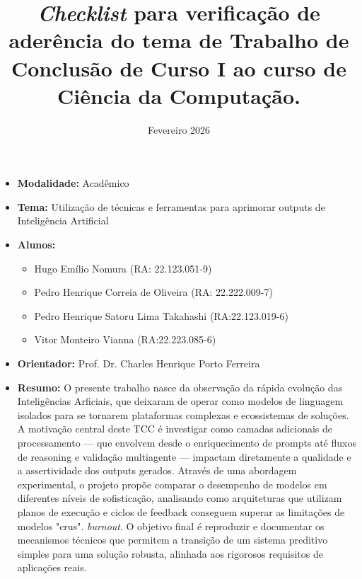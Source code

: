 \documentclass[11pt,a4,oneside]{article}
\title{\textit{Checklist} para verificação de aderência do tema de Trabalho de Conclusão de Curso I ao curso de Ciência da Computação.}
\date{Fevereiro 2026}
\begin{document}
\pagestyle{fancy}
\pagestyle{fancy}
\fancyhead{}

\maketitle
\begin{itemize}
\item \textbf{Modalidade:} Acadêmico
\item \textbf{Tema:} Utilização de técnicas e ferramentas para aprimorar outputs de Inteligência Artificial
\item \textbf{Alunos:}
\begin{itemize}
    \item Hugo Emílio Nomura (RA: 22.123.051-9)
    \item Pedro Henrique Correia de Oliveira (RA: 22.222.009-7)
    \item Pedro Henrique Satoru Lima Takahashi (RA:22.123.019-6)
    \item Vitor Monteiro Vianna (RA:22.223.085-6)
\end{itemize}
\item \textbf{Orientador:} Prof. Dr. Charles Henrique Porto Ferreira
\item \textbf{Resumo:} O presente trabalho nasce da observação da rápida evolução das Inteligências Arficiais, que deixaram de operar como modelos de linguagem isolados para se tornarem plataformas complexas e ecossistemas de soluções. A motivação central deste TCC é investigar como camadas adicionais de processamento — que envolvem desde o enriquecimento de prompts até fluxos de reasoning e validação multiagente — impactam diretamente a qualidade e a assertividade dos outputs gerados. Através de uma abordagem experimental, o projeto propõe comparar o desempenho de modelos em diferentes níveis de sofisticação, analisando como arquiteturas que utilizam planos de execução e ciclos de feedback conseguem superar as limitações de modelos "crus". 
\textit{burnout}. O objetivo final é reproduzir e documentar os mecanismos técnicos que permitem a transição de um sistema preditivo simples para uma solução robusta, alinhada aos rigorosos requisitos de aplicações reais.
\end{itemize}
\end{document}
